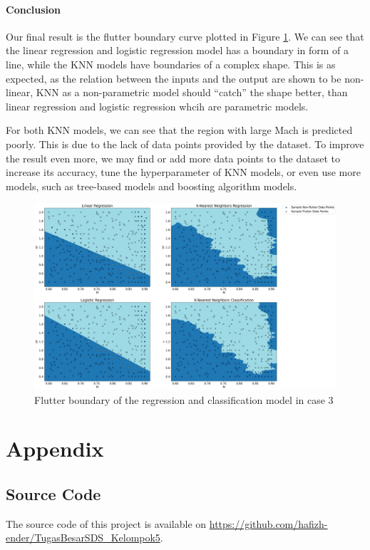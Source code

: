 \documentclass[conf]{new-aiaa}
\begin{document}
\paragraph{Conclusion} Our final result is the flutter boundary curve plotted in Figure \ref{fig:case3_boundary}. We can see that the linear regression and logistic regression model has a boundary in form of a line, while the KNN models have boundaries of a complex shape. This is as expected, as the relation between the inputs and the output are shown to be non-linear, KNN as a non-parametric model should ``catch'' the shape better, than linear regression and logistic regression whcih are parametric models.

For both KNN models, we can see that the region with large Mach is predicted poorly. This is due to the lack of data points provided by the dataset. To improve the result even more, we may find or add more data points to the dataset to increase its accuracy, tune the hyperparameter of KNN models, or even use more models, such as tree-based models and boosting algorithm models. 
\begin{figure}[H]
    \centering
    \includegraphics[width=1.0\textwidth]{graph/case3_boundary.png}
    \caption{Flutter boundary of the regression and classification model in case 3}
    \label{fig:case3_boundary}
\end{figure}

\section*{Appendix}
\subsection*{Source Code}
\noindent The source code of this project is available on \url{https://github.com/hafizh-ender/TugasBesarSDS_Kelompok5}.
\end{document}
